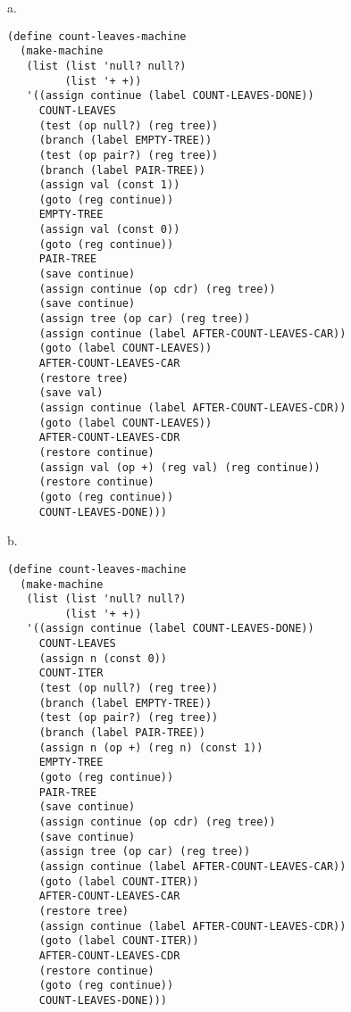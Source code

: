 \documentclass[a4paper,12pt]{article}
\newcommand{\subpar}[1]{\medskip \noindent #1.}
\begin{document}
\subpar{a}
\begin{lstlisting}
(define count-leaves-machine
  (make-machine
   (list (list 'null? null?)
         (list '+ +))
   '((assign continue (label COUNT-LEAVES-DONE))
     COUNT-LEAVES
     (test (op null?) (reg tree))
     (branch (label EMPTY-TREE))
     (test (op pair?) (reg tree))
     (branch (label PAIR-TREE))
     (assign val (const 1))
     (goto (reg continue))
     EMPTY-TREE
     (assign val (const 0))
     (goto (reg continue))
     PAIR-TREE
     (save continue)
     (assign continue (op cdr) (reg tree))
     (save continue)
     (assign tree (op car) (reg tree))
     (assign continue (label AFTER-COUNT-LEAVES-CAR))
     (goto (label COUNT-LEAVES))
     AFTER-COUNT-LEAVES-CAR
     (restore tree)
     (save val)
     (assign continue (label AFTER-COUNT-LEAVES-CDR))
     (goto (label COUNT-LEAVES))
     AFTER-COUNT-LEAVES-CDR
     (restore continue)
     (assign val (op +) (reg val) (reg continue))
     (restore continue)
     (goto (reg continue))
     COUNT-LEAVES-DONE)))
\end{lstlisting}

\subpar{b}
\begin{lstlisting}
(define count-leaves-machine
  (make-machine
   (list (list 'null? null?)
         (list '+ +))
   '((assign continue (label COUNT-LEAVES-DONE))
     COUNT-LEAVES
     (assign n (const 0))
     COUNT-ITER
     (test (op null?) (reg tree))
     (branch (label EMPTY-TREE))
     (test (op pair?) (reg tree))
     (branch (label PAIR-TREE))
     (assign n (op +) (reg n) (const 1))
     EMPTY-TREE
     (goto (reg continue))
     PAIR-TREE
     (save continue)
     (assign continue (op cdr) (reg tree))
     (save continue)
     (assign tree (op car) (reg tree))
     (assign continue (label AFTER-COUNT-LEAVES-CAR))
     (goto (label COUNT-ITER))
     AFTER-COUNT-LEAVES-CAR
     (restore tree)
     (assign continue (label AFTER-COUNT-LEAVES-CDR))
     (goto (label COUNT-ITER))
     AFTER-COUNT-LEAVES-CDR
     (restore continue)
     (goto (reg continue))
     COUNT-LEAVES-DONE)))
\end{lstlisting}
\end{document}
